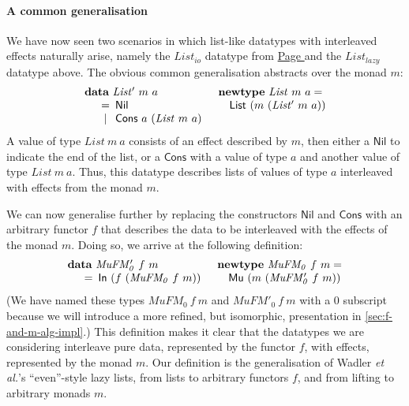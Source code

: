\documentclass{jfp1}
\newcommand{\kw}[1]{\textbf{#1}}
\begin{document}
\paragraph{A common generalisation} We have now seen two scenarios in
which list-like datatypes with interleaved effects naturally arise,
namely the $\mathit{List_{io}}$ datatype from
\hyperref[defn:listio]{Page \pageref*{defn:listio}} and the
$\mathit{List_{lazy}}$ datatype above. The obvious common
generalisation abstracts over the monad $m$:
\begin{displaymath}
  \begin{array}{ll}
    \kw{data}~\mathit{List'}~m~a
    &
    \kw{newtype}~\mathit{List}~m~a = 
    \\
    \quad
    \begin{array}[t]{c@{\hspace{0.5em}}l}
      = & \mathsf{Nil} \\
      | & \mathsf{Cons}~a~(\mathit{List}~m~a) \\
    \end{array}
    &
    \quad \mathsf{List}~(m~(\mathit{List'}~m~a))
  \end{array}
\end{displaymath}
A value of type $\mathit{List}~m~a$ consists of an effect described by
$m$, then either a $\mathsf{Nil}$ to indicate the end of the list,
or a $\mathsf{Cons}$ with a value of type $a$ and another value of
type $\mathit{List}~m~a$. Thus, this datatype describes lists of values
of type $a$ interleaved with effects from the monad $m$.

We can now generalise further by replacing the constructors
$\mathsf{Nil}$ and $\mathsf{Cons}$ with an arbitrary functor $f$ that
describes the data to be interleaved with the effects of the monad
$m$. Doing so, we arrive at the following definition:
\begin{displaymath}
  \begin{array}{ll}
    \kw{data}~\mathit{MuFM_0'}~f~m
    &
    \kw{newtype}~\mathit{MuFM_0}~f~m =
    \\
    \quad
    \begin{array}[t]{c@{\hspace{0.5em}}l}
      = & \mathsf{In}~(f~(\mathit{MuFM_0}~f~m))
    \end{array}
    &
    \quad \mathsf{Mu}~(m~(\mathit{MuFM_0'}~f~m))
  \end{array}
\end{displaymath}
(We have named these types $\mathit{MuFM_0}~f~m$ and
$\mathit{MuFM'_0}~f~m$ with a $0$ subscript because we will introduce
a more refined, but isomorphic, presentation in
\autoref{sec:f-and-m-alg-impl}.) This definition makes it clear that
the datatypes we are considering interleave pure data, represented by
the functor $f$, with effects, represented by the monad $m$. Our
definition is the generalisation of Wadler \emph{et al.}'s
``even''-style lazy lists, from lists to arbitrary functors $f$, and
from lifting to arbitrary monads $m$.
\end{document}

